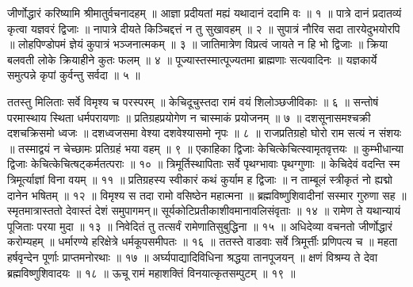 
जीर्णोद्धारं करिष्यामि श्रीमातुर्वचनादहम् ॥
आज्ञा प्रदीयतां मह्यं यथादानं ददामि वः ॥ १ ॥
पात्रे दानं प्रदातव्यं कृत्वा यज्ञवरं द्विजाः ॥
नापात्रे दीयते किञ्चिद्दत्तं न तु सुखावहम् ॥ २ ॥
सुपात्रं नौरिव सदा तारयेदुभयोरपि ॥
लोहपिण्डोपमं ज्ञेयं कुपात्रं भञ्जनात्मकम् ॥ ३ ॥
जातिमात्रेण विप्रत्वं जायते न हि भो द्विजाः ॥
क्रिया बलवती लोके क्रियाहीने कुतः फलम् ॥ ४ ॥
पूज्यास्तस्मात्पूज्यतमा ब्राह्मणाः सत्यवादिनः ॥
यज्ञकार्ये समुत्पन्ने कृपां कुर्वन्तु सर्वदा ॥ ५ ॥

ततस्तु मिलिताः सर्वे विमृश्य च परस्परम् ॥
केचिदूचुस्तदा रामं वयं शिलोञ्छजीविकाः ॥ ६ ॥
सन्तोषं परमास्थाय स्थिता धर्मपरायणाः ॥
प्रतिग्रहप्रयोगेण न चास्माकं प्रयोजनम् ॥ ७ ॥
दशसूनासमश्चक्री दशचक्रिसमो ध्वजः ॥
दशध्वजसमा वेश्या दशवेश्यासमो नृपः ॥ ८ ॥
राजप्रतिग्रहो घोरो राम सत्यं न संशयः ॥
तस्माद्वयं न चेच्छामः प्रतिग्रहं भया वहम् ॥ ९ ॥
एकाहिका द्विजाः केचित्केचित्स्वामृतवृत्तयः ॥
कुम्भीधान्या द्विजाः केचित्केचित्षट्कर्मतत्पराः ॥ १० ॥
त्रिमूर्तिस्थापिताः सर्वे पृथग्भावाः पृथग्गुणाः ॥
केचिदेवं वदन्ति स्म त्रिमूर्त्याज्ञां विना वयम् ॥ ११ ॥
प्रतिग्रहस्य स्वीकारं कथं कुर्याम ह द्विजाः ॥
न ताम्बूलं स्त्रीकृतं नो ह्यद्मो दानेन भषितम् ॥ १२ ॥
विमृश्य स तदा रामो वसिष्ठेन महात्मना ॥
ब्रह्मविष्णुशिवादीनां सस्मार गुरुणा सह ॥
स्मृतमात्रास्ततो देवास्तं देशं समुपागमन्॥
सूर्यकोटिप्रतीकाशीवमानावलिसंवृताः ॥ १४ ॥
रामेण ते यथान्यायं पूजिताः परया मुदा ॥ १३ ॥
निवेदितं तु तत्सर्वं रामेणातिसुबुद्धिना ॥ १५ ॥
अधिदेव्या वचनतो जीर्णोद्धारं करोम्यहम् ॥
धर्मारण्ये हरिक्षेत्रे धर्मकूपसमीपतः ॥ १६ ॥
ततस्ते वाडवाः सर्वे त्रिमूर्त्तीः प्रणिपत्य च ॥
महता हर्षवृन्देन पूर्णाः प्राप्तमनोरथाः ॥ १७ ॥
अर्घ्यपाद्यादिविधिना श्रद्धया तानपूजयन् ॥
क्षणं विश्रम्य ते देवा ब्रह्मविष्णुशिवादयः ॥ १८ ॥
ऊचू रामं महाशक्तिं विनयात्कृतसम्पुटम् ॥ १९ ॥

